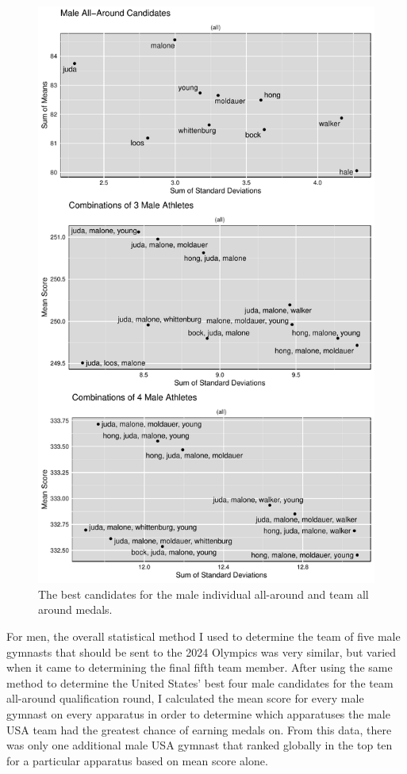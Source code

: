 \documentclass[12pt]{article}
\begin{document}
\begin{figure}
  \centering
  \includegraphics[scale=0.7]{FinalMaleAllAroundPlot.pdf}
  \caption{The best candidates for the male individual all-around and team all around medals.}
  \label{fig:MAA}
\end{figure}


For men, the overall statistical method I used to determine the team of five male gymnasts that should be sent 
to the 2024 Olympics was very similar, but varied when it came to determining the final fifth team member. After 
using the same method to determine the United States' best four male candidates for the team all-around qualification 
round, I calculated the mean score for every male gymnast on every apparatus in order to determine which apparatuses 
the male USA team had the greatest chance of earning medals on. From this data, there was only one additional male 
USA gymnast that ranked globally in the top ten for a particular apparatus based on mean score alone.
\end{document}
